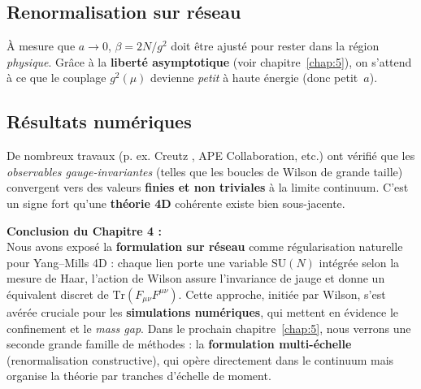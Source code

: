 \subsection*{Renormalisation sur réseau}
À mesure que \(a\to 0\), \(\beta=2N/g^2\) doit être ajusté pour rester dans la région \emph{physique}. Grâce à la \textbf{liberté asymptotique} (voir chapitre~\ref{chap:5}), on s’attend à ce que le couplage \(g^2(\mu)\) devienne \emph{petit} à haute énergie (donc petit \(\,a\)).

\subsection*{Résultats numériques}
De nombreux travaux (p. ex. Creutz \cite{Creutz1983}, APE Collaboration, etc.) ont vérifié que les \emph{observables gauge-invariantes} (telles que les boucles de Wilson de grande taille) convergent vers des valeurs \textbf{finies et non triviales} à la limite continuum. C’est un signe fort qu’une \textbf{théorie 4D} cohérente existe bien sous-jacente.

\vspace{2em}

\noindent
\textbf{Conclusion du Chapitre 4 :}\\
Nous avons exposé la \textbf{formulation sur réseau} comme régularisation naturelle pour Yang--Mills 4D : chaque lien porte une variable \(\mathrm{SU}(N)\) intégrée selon la mesure de Haar, l’action de Wilson assure l’invariance de jauge et donne un équivalent discret de \(\mathrm{Tr}(F_{\mu\nu}F^{\mu\nu})\). Cette approche, initiée par Wilson, s’est avérée cruciale pour les \textbf{simulations numériques}, qui mettent en évidence le confinement et le \emph{mass gap}.  
Dans le prochain chapitre~\ref{chap:5}, nous verrons une seconde grande famille de méthodes : la \textbf{formulation multi-échelle} (renormalisation constructive), qui opère directement dans le continuum mais organise la théorie par tranches d’échelle de moment.

\vspace{2em}

